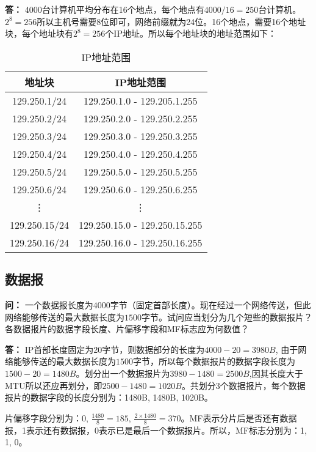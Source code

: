 \documentclass[12pt,hyperref,a4paper,UTF8]{ctexart}
\begin{document}
\textbf{答：}
4000台计算机平均分布在16个地点，每个地点有$4000/16=250$台计算机。$2^8 = 256$所以主机号需要8位即可，网络前缀就为24位。16个地点，需要16个地址块，每个地址块有$2^8=256$个IP地址。所以每个地址块的地址范围如下：
\begin{table}[h]
    \centering
    \begin{tabular}{c|c}
        \toprule
        地址块 & IP地址范围\\
        \midrule
        129.250.1/24 & 129.250.1.0 - 129.205.1.255\\
        129.250.2/24 & 129.250.2.0 - 129.250.2.255\\
        129.250.3/24 & 129.250.3.0 - 129.250.3.255\\
        129.250.4/24 & 129.250.4.0 - 129.250.4.255\\
        129.250.5/24 & 129.250.5.0 - 129.250.5.255\\
        129.250.6/24 & 129.250.6.0 - 129.250.6.255\\
        \vdots & \vdots\\
        129.250.15/24 & 129.250.15.0 - 129.250.15.255\\
        129.250.16/24 & 129.250.16.0 - 129.250.16.255\\
        \bottomrule
    \end{tabular}
    \caption{IP地址范围}\label{IP地址范围}
\end{table}


\subsection{数据报}
\textbf{问：}
一个数据报长度为$4000$字节（固定首部长度）。现在经过一个网络传送，但此网络能够传送的最大数据长度为$1500$字节。试问应当划分为几个短些的数据报片？各数据报片的数据字段长度、片偏移字段和MF标志应为何数值？

\textbf{答：}
IP首部长度固定为20字节，则数据部分的长度为$4000-20=3980B$, 由于网络能够传送的最大数据长度为$1500$字节，所以每个数据报片的数据字段长度为$1500-20=1480B$。划分出一个数据报片为$3980-1480=2500B$,因其长度大于MTU所以还应再划分，即$2500-1480=1020B$。共划分3个数据报片，每个数据报片的数据字段的长度分别为：1480B, 1480B, 1020B。

片偏移字段分别为：$0$, $\frac{1480}{8}=185$, $\frac{2 \times 1480}{8} =370$。MF表示分片后是否还有数据报，1表示还有数据报，0表示已是最后一个数据报片。所以，MF标志分别为：1, 1, 0。
\end{document}
